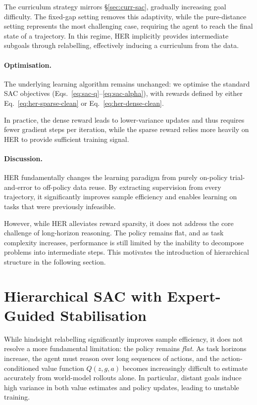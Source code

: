 The curriculum strategy mirrors \S\ref{sec:curr-sac}, gradually
increasing goal difficulty. The fixed-gap setting removes this
adaptivity, while the pure-distance setting represents the most
challenging case, requiring the agent to reach the final state of a
trajectory. In this regime, HER implicitly provides intermediate
subgoals through relabelling, effectively inducing a curriculum from the
data.

\paragraph{Optimisation.}
The underlying learning algorithm remains unchanged: we optimise the
standard SAC objectives (Eqs.~\eqref{eq:sac-q}--\eqref{eq:sac-alpha}),
with rewards defined by either Eq.~\eqref{eq:her-sparse-clean} or
Eq.~\eqref{eq:her-dense-clean}. 

In practice, the dense reward leads to lower-variance updates and thus
requires fewer gradient steps per iteration, while the sparse reward
relies more heavily on HER to provide sufficient training signal.

\paragraph{Discussion.}
HER fundamentally changes the learning paradigm from purely on-policy
trial-and-error to off-policy data reuse. By extracting supervision from
every trajectory, it significantly improves sample efficiency and enables
learning on tasks that were previously infeasible.

However, while HER alleviates reward sparsity, it does not address the
core challenge of long-horizon reasoning. The policy remains flat, and as
task complexity increases, performance is still limited by the inability
to decompose problems into intermediate steps. This motivates the
introduction of hierarchical structure in the following section.

\section{Hierarchical SAC with Expert-Guided Stabilisation}
\label{sec:joint}

While hindsight relabelling significantly improves sample efficiency, it
does not resolve a more fundamental limitation: the policy remains
\emph{flat}. As task horizons increase, the agent must reason over long
sequences of actions, and the action-conditioned value function
$Q(z,g,a)$ becomes increasingly difficult to estimate accurately from
world-model rollouts alone. In particular, distant goals induce high
variance in both value estimates and policy updates, leading to unstable
training.


